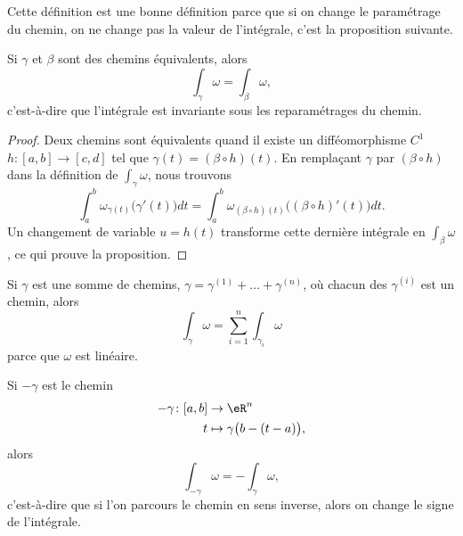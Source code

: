 Cette définition est une bonne définition parce que si on change le paramétrage du chemin, on ne change pas la valeur de l'intégrale, c'est la proposition suivante.
\begin{proposition}
	Si \( \gamma\) et \( \beta\) sont des chemins équivalents, alors
	\begin{equation}
		\int_{\gamma}\omega=\int_{\beta}\omega,
	\end{equation}
	c'est-à-dire que l'intégrale est invariante sous les reparamétrages du chemin.
\end{proposition}
\begin{proof}
	Deux chemins sont équivalents quand il existe un difféomorphisme \( C^1\) \( h\colon [a,b]\to [c,d]\) tel que \( \gamma(t)=(\beta\circ h)(t)\). En remplaçant \( \gamma\) par \( (\beta\circ h)\) dans la définition de \( \int_{\gamma}\omega\), nous trouvons
	\begin{equation}
		\int_a^b\omega_{\gamma(t)}\big( \gamma'(t) \big)dt=\int_a^b\omega_{(\beta\circ h)(t)}\big( (\beta\circ h)'(t) \big)dt.
	\end{equation}
	Un changement de variable \( u=h(t)\) transforme cette dernière intégrale en \( \int_{\beta}\omega\), ce qui prouve la proposition.
\end{proof}

\begin{remark}
	Si \( \gamma\) est une somme de chemins, \( \gamma=\gamma^{(1)}+\ldots+\gamma^{(n)}\), où chacun des \( \gamma^{(i)}\) est un chemin, alors
	\begin{equation}
		\int_{\gamma}\omega=\sum_{i=1}^n\int_{\gamma_i}\omega
	\end{equation}
	parce que \( \omega\) est linéaire.
\end{remark}

\begin{remark}
	Si \( -\gamma\) est le chemin
	\begin{equation}
		\begin{aligned}
			- \gamma\colon [a,b] & \to \eR^n                          \\
			t                    & \mapsto \gamma\big( b-(t-a) \big),
		\end{aligned}
	\end{equation}
	alors
	\begin{equation}
		\int_{-\gamma}\omega=-\int_{\gamma}\omega,
	\end{equation}
	c'est-à-dire que si l'on parcours le chemin en sens inverse, alors on change le signe de l'intégrale.
\end{remark}

